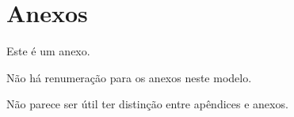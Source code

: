 



\chapter{Anexos}
\label{Atc_ap01}
Este é um anexo.

Não há renumeração para os anexos neste modelo.

Não parece ser útil ter distinção entre apêndices e anexos.


